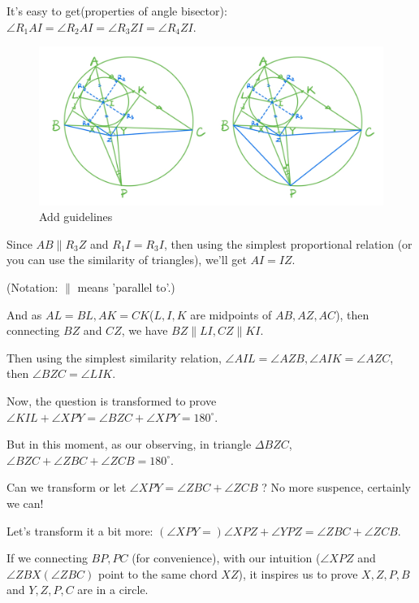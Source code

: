 \documentclass{Math_Note}
\begin{document}
\begin{sol}
It's easy to get(properties of angle bisector): $\angle R_{1}AI=\angle R_{2}AI=\angle R_{3}ZI=\angle R_{4}ZI$. 
\begin{figure}[H]
    \centering
    \includegraphics[scale=0.22]{"./Figures/Q4F2.png"}
    \caption{Add guidelines}
\end{figure}
Since $AB \parallel R_{3}Z$ and $R_{1}I=R_{3}I$, then using the simplest proportional relation (or you can use the similarity of triangles), we'll get $AI=IZ$.

(Notation: $\parallel$ means 'parallel to'.)

And as $AL=BL, AK=CK$($L, I, K$ are midpoints of $AB, AZ, AC$), then connecting $BZ$ and $CZ$, we have $BZ \parallel LI, CZ \parallel KI$. 

Then using the simplest similarity relation, $\angle AIL=\angle AZB, \angle AIK=\angle AZC$, then $\angle BZC=\angle LIK$. 

Now, the question is transformed to prove $\angle KIL+\angle XPY=\angle BZC+\angle XPY=180^{\circ}$. 

But in this moment, as our observing, in triangle $\Delta BZC$, $\angle BZC+\angle ZBC+\angle ZCB=180^{\circ}$. 

Can we transform or let $\angle XPY=\angle ZBC+\angle ZCB$ ? No more suspence, certainly we can! 

Let's transform it a bit more: $\left(\angle XPY=\right)\angle XPZ+\angle YPZ=\angle ZBC+\angle ZCB$. 

\marginpar{\textcolor{green}{point2}}
If we connecting $BP, PC$ (for convenience), with our intuition ($\angle XPZ$ and $\angle ZBX(\angle ZBC)$ point to the same chord $XZ$), 
it inspires us to prove $X,Z,P,B$ and $Y,Z,P,C$ are in a circle. 


\end{sol}
\end{document}
